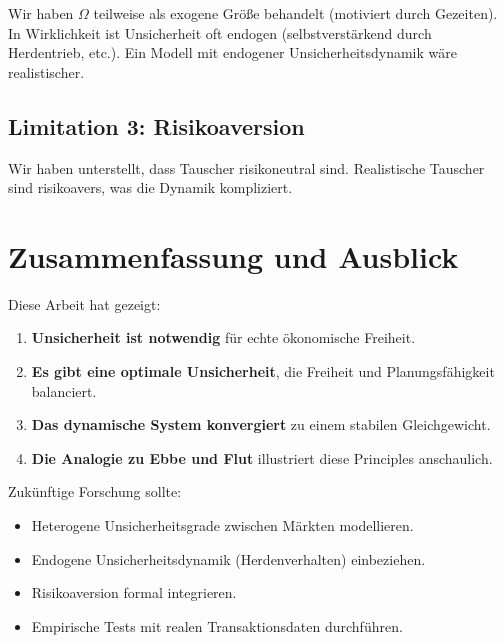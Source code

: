 \documentclass[a4paper,12pt]{article}
\theoremstyle{definition}
\begin{document}
Wir haben $\Omega$ teilweise als exogene Größe behandelt (motiviert durch Gezeiten). In Wirklichkeit ist Unsicherheit oft endogen (selbstverstärkend durch Herdentrieb, etc.). Ein Modell mit endogener Unsicherheitsdynamik wäre realistischer.

\subsection{Limitation 3: Risikoaversion}

Wir haben unterstellt, dass Tauscher risikoneutral sind. Realistische Tauscher sind risikoavers, was die Dynamik kompliziert.

\section{Zusammenfassung und Ausblick}

Diese Arbeit hat gezeigt:

\begin{enumerate}
    \item \textbf{Unsicherheit ist notwendig} für echte ökonomische Freiheit.
    \item \textbf{Es gibt eine optimale Unsicherheit}, die Freiheit und Planungsfähigkeit balanciert.
    \item \textbf{Das dynamische System konvergiert} zu einem stabilen Gleichgewicht.
    \item \textbf{Die Analogie zu Ebbe und Flut} illustriert diese Principles anschaulich.
\end{enumerate}

Zukünftige Forschung sollte:
\begin{itemize}
    \item Heterogene Unsicherheitsgrade zwischen Märkten modellieren.
    \item Endogene Unsicherheitsdynamik (Herdenverhalten) einbeziehen.
    \item Risikoaversion formal integrieren.
    \item Empirische Tests mit realen Transaktionsdaten durchführen.
\end{itemize}


\appendix
\end{document}
